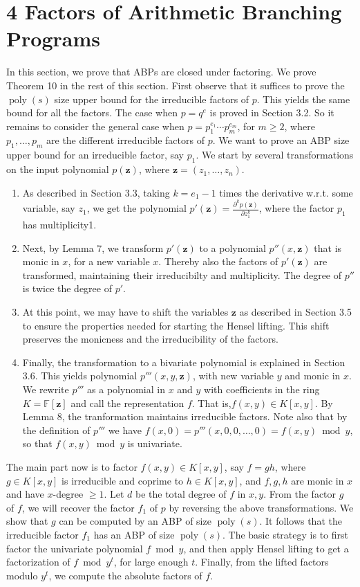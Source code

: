 \documentclass[10pt,a4paper]{article}
\begin{document}
\section*{4 Factors of Arithmetic Branching Programs}
In this section, we prove that ABPs are closed under factoring.
\setcounter{nttheorem}{10}
We prove Theorem 10 in the rest of this section. First observe that it suffices to prove the $\operatorname{poly}(s)$ size upper bound for the irreducible factors of $p$. This yields the same bound for all the factors. The case when $p=q^e$ is proved in Section 3.2. So it remains to consider the general case when $p=p_1^{e_1}\cdots p_m^{e_m}$, for $m\geq2$, where $p_1,\ldots,p_m$ are the different irreducible factors of $p$. We want to prove an ABP size upper bound for an irreducible factor, say $p_1$.
We start by several transformations on the input polynomial $p(\mathbf z)$, where $\mathbf z=(z_1,\ldots,z_n)$.
\begin{enumerate}
\item As described in Section 3.3, taking $k=e_1-1$ times the derivative w.r.t. some variable, say $z_1$, we get the polynomial $p'(\mathbf z)=\frac{\partial^kp(\mathbf z)}{\partial z_1^k}$, where the factor $p_1$ has multiplicity1.
\item Next, by Lemma 7, we transform $p'(\mathbf z)$ to a polynomial $p''(x,\mathbf z)$ that is monic in $x$, for a new variable $x$. Thereby also the factors of $p'(\mathbf z)$ are transformed, maintaining their irreducibilty and multiplicity. The degree of $p''$ is twice the degree of $p'$.
\item At this point, we may have to shift the variables $\mathbf z$ as described in Section 3.5 to ensure the properties needed for starting the Hensel lifting. This shift preserves the monicness and the irreducibility of the factors.
\item Finally, the transformation to a bivariate polynomial is explained in Section 3.6. This yields polynomial $p'''(x,y,\mathbf z)$, with new variable $y$ and monic in $x$. We rewrite $p'''$ as a polynomial in $x$ and $y$ with coefficients in the ring $K=\mathbb F[\mathbf z]$ and call the representation $f$. That is,$f(x,y)\in K[x,y]$. By Lemma 8, the tranformation maintains irreducible factors. Note also that by the definition of $p'''$ we have $f(x,0)=p'''(x,0,0,\ldots,0)=f(x,y)\bmod y$, so that $f(x,y)\bmod y$ is univariate.
\end{enumerate}
The main part now is to factor $f(x,y)\in K[x,y]$, say $f=gh$, where $g\in K[x,y]$ is irreducible and coprime to $h\in K[x,y]$, and $f,g,h$ are monic in $x$ and have $x$-degree $\geq1$. Let $d$ be the total degree of $f$ in $x,y$.
From the factor $g$ of $f$, we will recover the factor $f_1$ of $p$ by reversing the above transformations. We show that $g$ can be computed by an ABP of size $\operatorname{poly}(s)$. It follows that the irreducible factor $f_1$ has an ABP of size $\operatorname{poly}(s)$.
The basic strategy is to first factor the univariate polynomial $f\bmod y$, and then apply Hensel lifting to get a factorization of $f\bmod y^t$, for large enough $t$. Finally, from the lifted factors modulo $y^t$, we compute the absolute factors of $f$.
\end{document}
